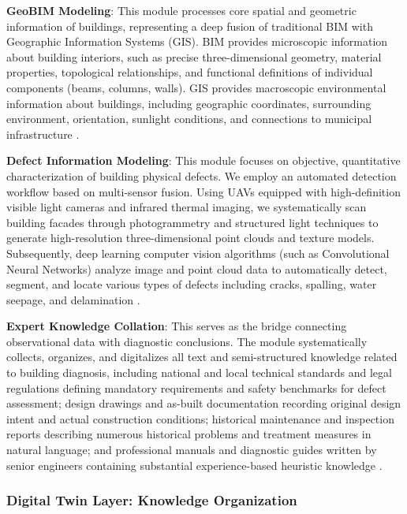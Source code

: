 \textbf{GeoBIM Modeling}: This module processes core spatial and geometric information of buildings, representing a deep fusion of traditional BIM with Geographic Information Systems (GIS). BIM provides microscopic information about building interiors, such as precise three-dimensional geometry, material properties, topological relationships, and functional definitions of individual components (beams, columns, walls). GIS provides macroscopic environmental information about buildings, including geographic coordinates, surrounding environment, orientation, sunlight conditions, and connections to municipal infrastructure \cite{boje2020towards}.

\textbf{Defect Information Modeling}: This module focuses on objective, quantitative characterization of building physical defects. We employ an automated detection workflow based on multi-sensor fusion. Using UAVs equipped with high-definition visible light cameras and infrared thermal imaging, we systematically scan building facades through photogrammetry and structured light techniques to generate high-resolution three-dimensional point clouds and texture models. Subsequently, deep learning computer vision algorithms (such as Convolutional Neural Networks) analyze image and point cloud data to automatically detect, segment, and locate various types of defects including cracks, spalling, water seepage, and delamination \cite{spencer2019advances}.

\textbf{Expert Knowledge Collation}: This serves as the bridge connecting observational data with diagnostic conclusions. The module systematically collects, organizes, and digitalizes all text and semi-structured knowledge related to building diagnosis, including national and local technical standards and legal regulations defining mandatory requirements and safety benchmarks for defect assessment; design drawings and as-built documentation recording original design intent and actual construction conditions; historical maintenance and inspection reports describing numerous historical problems and treatment measures in natural language; and professional manuals and diagnostic guides written by senior engineers containing substantial experience-based heuristic knowledge \cite{hamdan2021semantic}.

\subsubsection{Digital Twin Layer: Knowledge Organization}

